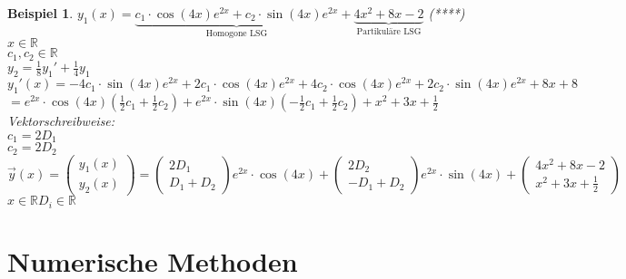 \documentclass[fontset=ubuntu,12pt,a4paper]{scrreprt}
\newtheorem{beispiel}[defi]{Beispiel}
\begin{document}
\begin{beispiel}
         \( y_1(x)=\underbrace{c_1\cdot\cos(4x)e^{2x}+c_2\cdot\sin(4x)e^{2x}}_{\text{Homogone LSG}}+\underbrace{4x^2+8x-2}_{\text{Partikuläre LSG}}\)  (****) \\ \(x\in\mathbb{R}\) \\ \(c_1,c_2\in\mathbb{R}\) \\
         \(y_2=\frac{1}{8}y_1'+\frac{1}{4}y_1\)\\
         \(y_1'(x)=-4c_1\cdot\sin(4x)e^{2x}+2c_1\cdot\cos(4x)e^{2x}+4c_2\cdot\cos(4x)e^{2x}+2c_2\cdot\sin(4x)e^{2x}+8x+8 \) \\
         \(=e^{2x}\cdot\cos(4x)(
         \frac{1}{2}c_1+\frac{1}{2}c_2
         )+e^{2x}\cdot\sin(4x)(
         -\frac{1}{2}c_1+\frac{1}{2}c_2
         )+x^2+3x+\frac{1}{2} \) \\
         Vektorschreibweise: \\
         \(c_1=2D_1\) \\
         \(c_2=2D_2\) \\
         \( \vec{y}(x)=\begin{pmatrix}
         y_1(x) \\ y_2(x)
         \end{pmatrix}=\begin{pmatrix}2D_1 \\ D_1+D_2 \end{pmatrix} e^{2x}\cdot\cos(4x)+\begin{pmatrix}2D_2 \\ -D_1+D_2 \end{pmatrix}e^{2x}\cdot\sin(4x) + \begin{pmatrix}4x^2+8x-2 \\ x^2+3x +\frac{1}{2} \end{pmatrix} \)\\\(x\in\mathbb{R} D_i\in\mathbb{R}\)
         
         
     \end{beispiel}
\chapter{Numerische Methoden}
\end{document}
